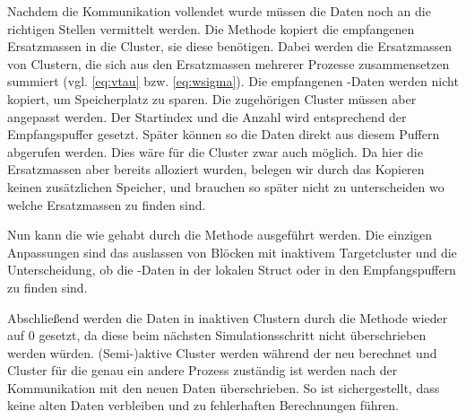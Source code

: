     Nachdem die Kommunikation vollendet wurde müssen die Daten noch an die richtigen Stellen vermittelt werden. Die Methode  kopiert die empfangenen Ersatzmassen in die 
    Cluster, sie diese benötigen. Dabei werden die Ersatzmassen von Clustern, die sich aus den Ersatzmassen mehrerer Prozesse zusammensetzen summiert (vgl. \autoref{eq:vtau} bzw. \autoref{eq:wsigma}).
    Die empfangenen -Daten werden nicht kopiert, um Speicherplatz zu sparen. Die zugehörigen Cluster müssen aber angepasst werden. Der Startindex und die 
    Anzahl wird entsprechend der Empfangspuffer gesetzt. Später können so die Daten direkt aus diesem Puffern abgerufen werden. Dies wäre für die Cluster zwar auch möglich. Da hier die Ersatzmassen
    aber bereits alloziert wurden, belegen wir durch das Kopieren keinen zusätzlichen Speicher, und brauchen so später nicht zu unterscheiden wo welche Ersatzmassen zu finden sind.
    
    Nun kann die \koppl wie gehabt durch die Methode  ausgeführt werden. Die einzigen Anpassungen sind das auslassen von Blöcken mit inaktivem Targetcluster und die Unterscheidung,
    ob die -Daten in der lokalen  Struct oder in den Empfangspuffern zu finden sind.
    
    Abschließend werden die Daten in inaktiven Clustern durch die Methode  wieder auf $0$ gesetzt, da diese beim nächsten Simulationsschritt nicht überschrieben
    werden würden. (Semi-)aktive Cluster werden während der \vorw neu berechnet und Cluster für die genau ein andere Prozess zuständig ist werden nach der Kommunikation mit den neuen Daten überschrieben.
    So ist sichergestellt, dass keine alten Daten verbleiben und zu fehlerhaften Berechnungen führen.
    